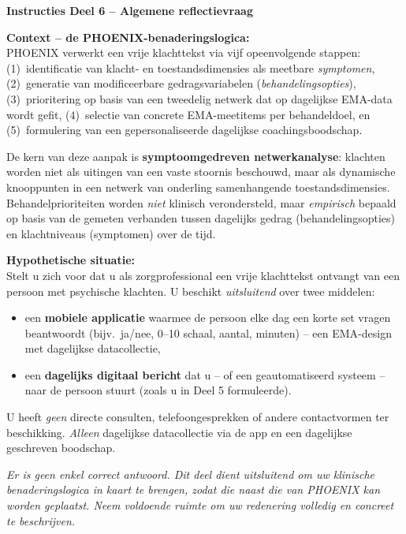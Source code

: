 \documentclass[11pt,a4paper]{article}
\begin{document}
\begin{tcolorbox}[colback=AccentOrange,colframe=GoldAmber,arc=2.5mm,boxrule=0.9pt,
  left=10pt,right=10pt,top=9pt,bottom=9pt]
\textbf{\color{GoldAmber}Instructies Deel 6 -- Algemene reflectievraag}

\smallskip\small
\textbf{Context -- de PHOENIX-benaderingslogica:}\\[0.3em]
PHOENIX verwerkt een vrije klachttekst via vijf opeenvolgende stappen:
(1)~identificatie van klacht- en toestandsdimensies als meetbare \emph{symptomen},
(2)~generatie van modificeerbare gedragsvariabelen (\emph{behandelingsopties}),
(3)~prioritering op basis van een tweedelig netwerk dat op dagelijkse EMA-data wordt gefit,
(4)~selectie van concrete EMA-meetitems per behandeldoel, en
(5)~formulering van een gepersonaliseerde dagelijkse coachingsboodschap.

De kern van deze aanpak is \textbf{symptoomgedreven netwerkanalyse}: klachten worden niet als
uitingen van een vaste stoornis beschouwd, maar als dynamische knooppunten in een netwerk van
onderling samenhangende toestandsdimensies. Behandelprioriteiten worden \emph{niet}
klinisch verondersteld, maar \emph{empirisch} bepaald op basis van de gemeten verbanden
tussen dagelijks gedrag (behandelingsopties) en klachtniveaus (symptomen) over de tijd.

\medskip
\textbf{Hypothetische situatie:}\\[0.3em]
Stelt u zich voor dat u als zorgprofessional een vrije klachttekst ontvangt van een persoon
met psychische klachten. U beschikt \emph{uitsluitend} over twee middelen:
\begin{itemize}[topsep=2pt,itemsep=1pt]
\item een \textbf{mobiele applicatie} waarmee de persoon elke dag een korte set vragen
beantwoordt (bijv.\ ja/nee, 0--10 schaal, aantal, minuten) -- een EMA-design met
dagelijkse datacollectie,
\item een \textbf{dagelijks digitaal bericht} dat u -- of een geautomatiseerd systeem --
naar de persoon stuurt (zoals u in Deel 5 formuleerde).
\end{itemize}
U heeft \emph{geen} directe consulten, telefoongesprekken of andere contactvormen ter beschikking.
\emph{Alleen} dagelijkse datacollectie via de app en een dagelijkse geschreven boodschap.

\medskip\small
\textit{Er is geen enkel correct antwoord. Dit deel dient uitsluitend om uw klinische
benaderingslogica in kaart te brengen, zodat die naast die van PHOENIX kan worden
geplaatst. Neem voldoende ruimte om uw redenering volledig en concreet te beschrijven.}
\end{tcolorbox}
\end{document}
